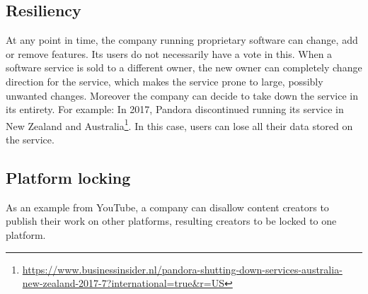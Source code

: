 \subsection{Resiliency}
At any point in time, the company running proprietary software can change, add or remove features. Its users do not necessarily have a vote in this. When a software service is sold to a different owner, the new owner can completely change direction for the service, which makes the service prone to large, possibly unwanted changes. Moreover the company can decide to take down the service in its entirety. For example: In 2017, Pandora discontinued running its service in New Zealand and Australia\footnote{\url{https://www.businessinsider.nl/pandora-shutting-down-services-australia-new-zealand-2017-7?international=true&r=US}}. In this case, users can lose all their data stored on the service. 
\subsection{Platform locking}
As an example from YouTube, a company can disallow content creators to publish their work on other platforms, resulting creators to be locked to one platform. 


